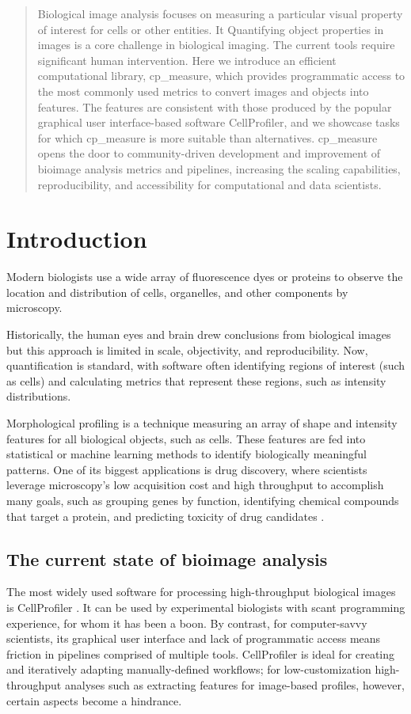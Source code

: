 \documentclass{article}
\begin{document}
\begin{abstract}
Biological image analysis focuses on measuring a particular visual property of interest for cells or other entities. It 
Quantifying object properties in images is a core challenge in biological imaging. The current tools require significant human intervention. Here we introduce an efficient computational library, cp\_measure, which provides programmatic access to the most commonly used metrics to convert images and objects into features. The features are consistent with those produced by the popular graphical user interface-based software CellProfiler, and we showcase tasks for which cp\_measure is more suitable than alternatives. cp\_measure opens the door to community-driven development and improvement of bioimage analysis metrics and pipelines, increasing the scaling capabilities, reproducibility, and accessibility for computational and data scientists.
\end{abstract}
\section{Introduction}
\label{sec:org4c9ba67}
Modern biologists use a wide array of fluorescence dyes or proteins to observe the location and distribution of cells, organelles, and other components by microscopy.

Historically, the human eyes and brain drew conclusions from biological images but this approach is limited in scale, objectivity, and reproducibility. Now, quantification is standard, with software often identifying regions of interest (such as cells) and calculating metrics that represent these regions, such as intensity distributions.

Morphological profiling is a technique measuring an array of shape and intensity features for all biological objects, such as cells. These features are fed into statistical or machine learning methods to identify biologically meaningful patterns. One of its biggest applications is drug discovery, where scientists leverage microscopy's low acquisition cost and high throughput to accomplish many goals, such as grouping genes by function, identifying chemical compounds that target a protein, and predicting toxicity of drug candidates \citep{sealDecadeSystematicReview2024}. 
\subsection{The current state of bioimage analysis}
\label{sec:org8f5b33d}
The most widely used software for processing high-throughput biological images is CellProfiler \citep{stirlingCellProfiler4Improvements2021}. It can be used by experimental biologists with scant programming experience, for whom it has been a boon. By contrast, for computer-savvy scientists, its graphical user interface and lack of programmatic access means friction in pipelines comprised of multiple tools. CellProfiler is ideal for creating and iteratively adapting manually-defined workflows; for low-customization high-throughput analyses such as extracting features for image-based profiles, however, certain aspects become a hindrance.
\end{document}
